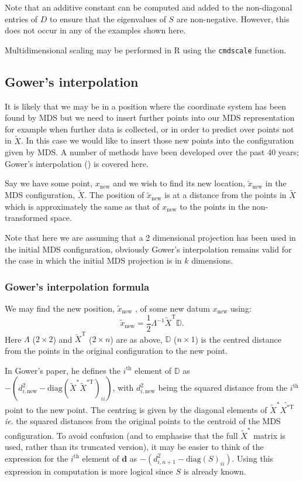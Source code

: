 \documentclass[a4paper,10pt]{article}
\newcommand{\tr}[1]{#1^{\text{T}}}
\newcommand{\cross}{\times}
\begin{document}
Note that an additive constant can be computed and added to the non-diagonal entries of $D$ to ensure that the eigenvalues of $S$ are non-negative. However, this does not occur in any of the examples shown here.

Multidimensional scaling may be performed in \textsf{R} using the \texttt{cmdscale} function. 

\subsection{Gower's interpolation} 
\label{gowers}
It is likely that we may be in a position where the coordinate system has been found by MDS but we need to insert further points into our MDS representation for example when further data is collected, or in order to predict over points not in $\tilde{X}$. In this case we would like to insert those new points into the configuration given by MDS. A number of methods have been developed over the past 40 years; Gower's interpolation (\cite{gower1968}) is covered here.

Say we have some point, $x_{\text{new}}$ and we wish to find its new location, $\tilde{x}_{\text{new}}$ in the MDS configuration, $\tilde{X}$. The position of $\tilde{x}_{\text{new}}$ is at a distance from the points in $\tilde{X}$ which is approximately the same as that of $x_{\text{new}}$ to the points in the non-transformed space. 

Note that here we are assuming that a 2 dimensional projection has been used in the initial MDS configuration, obviously Gower's interpolation remains valid for the case in which the initial MDS projection is in $k$ dimensions.

\subsubsection{Gower's interpolation formula}

We may find the new position, $\tilde{x}_{\text{new}}$ , of some new datum $x_{\text{new}}$ using:
\begin{equation}
\tilde{x}_{\text{new}} = \frac{1}{2} \Lambda^{-1} \tr{\tilde{X}} \mathbb{D}.
\label{gower}
\end{equation}
Here $\Lambda$ ($2 \cross 2$) and $\tr{\tilde{X}}$ ($2 \cross n$) are as above, $\mathbb{D}$ ($n \cross 1$) is the centred distance from the points in the original configuration to the new point.

In Gower's paper, he defines the $i^\text{th}$ element of $\mathbb{D}$ as $-(d^2_{i,\text{new}}-\text{diag}(\tilde{X}^* \tilde{X}^{*\text{T}})_{ii})$, with $d^2_{i,\text{new}}$ being the squared distance from the $i^\text{th}$ point to the new point. The centring is given by the diagonal elements of $\tilde{X}^*\tilde{X^{* \text{T}}}$ \emph{ie}. the squared distances from the original points to the centroid of the MDS configuration. To avoid confusion (and to emphasise that the full $\tilde{X}^*$ matrix is used, rather than its truncated version), it may be easier to think of the expression for the $i^\text{th}$ element of $\mathbf{d}$ as $-(d^2_{i,n+1}-\text{diag}(S)_{ii})$. Using this expression in computation is more logical since $S$ is already known.
\end{document}
